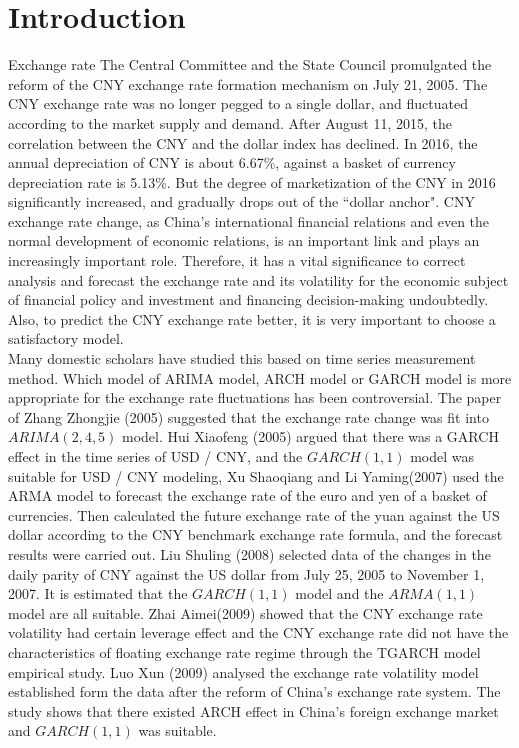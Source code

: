 \documentclass[12pt, a4paper, titlepage]{article}
\begin{document}
\section{Introduction}
Exchange rate 
The Central Committee and the State Council promulgated the reform of the CNY exchange rate formation mechanism on July 21, 2005. The CNY exchange rate was no longer pegged to a single dollar, and fluctuated according to the market supply and demand. After August 11, 2015, the correlation between the CNY and the dollar index has declined. In 2016, the annual depreciation of CNY is about 6.67\%, against a basket of currency depreciation rate is 5.13\%. But the degree of marketization of the CNY in 2016 significantly increased, and gradually drops out of the ``dollar anchor". CNY exchange rate change, as China's international financial relations and even the normal development of economic relations, is an important link and plays an increasingly important role. Therefore, it has a vital significance to correct analysis and forecast the exchange rate and its volatility for the economic subject of financial policy and investment and financing decision-making undoubtedly. Also, to predict the CNY exchange rate better, it is very important to choose a satisfactory model.\\

Many domestic scholars have studied this based on time series measurement method. Which model of ARIMA model, ARCH model or GARCH model is more appropriate for the exchange rate fluctuations has been controversial. The paper of Zhang Zhongjie (2005) suggested that the exchange rate change was fit into $ARIMA(2,4,5)$ model. Hui Xiaofeng (2005) argued that there was a GARCH effect in the time series of USD / CNY, and the $GARCH(1,1)$ model was suitable for USD / CNY modeling, Xu Shaoqiang and Li Yaming(2007) used the ARMA model to forecast the exchange rate of the euro and yen of a basket of currencies. Then calculated the future exchange rate of the yuan against the US dollar according to the CNY benchmark exchange rate formula, and the forecast results were carried out. Liu Shuling (2008) selected data of the changes in the daily parity of CNY against the US dollar from July 25, 2005 to November 1, 2007. It is estimated that the $GARCH(1,1)$ model and the $ARMA(1,1)$ model are all suitable. Zhai Aimei(2009) showed that the CNY exchange rate volatility had certain leverage effect and the CNY exchange rate did not have the characteristics of floating exchange rate regime through the TGARCH model empirical study. Luo Xun (2009) analysed the exchange rate volatility model established form the data after the reform of China's exchange rate system. The study shows that there existed ARCH effect in China's foreign exchange market and $GARCH(1,1)$ was suitable.\\
\end{document}
